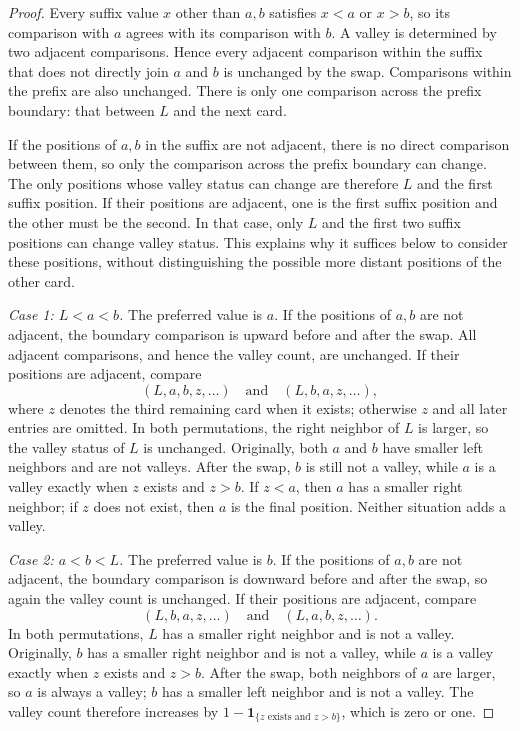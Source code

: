 \documentclass[10pt,a4paper]{amsart}
\numberwithin{equation}{section}
\begin{document}
\begin{proof}
Every suffix value $x$ other than $a,b$ satisfies $x<a$ or $x>b$, so its comparison with $a$ agrees with its comparison with $b$. A valley is determined by two adjacent comparisons. Hence every adjacent comparison within the suffix that does not directly join $a$ and $b$ is unchanged by the swap. Comparisons within the prefix are also unchanged. There is only one comparison across the prefix boundary: that between $L$ and the next card.

If the positions of $a,b$ in the suffix are not adjacent, there is no direct comparison between them, so only the comparison across the prefix boundary can change. The only positions whose valley status can change are therefore $L$ and the first suffix position. If their positions are adjacent, one is the first suffix position and the other must be the second. In that case, only $L$ and the first two suffix positions can change valley status. This explains why it suffices below to consider these positions, without distinguishing the possible more distant positions of the other card.

\emph{Case 1: $L<a<b$.}
The preferred value is $a$. If the positions of $a,b$ are not adjacent, the boundary comparison is upward before and after the swap. All adjacent comparisons, and hence the valley count, are unchanged. If their positions are adjacent, compare
\[
 (L,a,b,z,\ldots)\quad\text{and}\quad(L,b,a,z,\ldots),
\]
where $z$ denotes the third remaining card when it exists; otherwise $z$ and all later entries are omitted. In both permutations, the right neighbor of $L$ is larger, so the valley status of $L$ is unchanged. Originally, both $a$ and $b$ have smaller left neighbors and are not valleys. After the swap, $b$ is still not a valley, while $a$ is a valley exactly when $z$ exists and $z>b$. If $z<a$, then $a$ has a smaller right neighbor; if $z$ does not exist, then $a$ is the final position. Neither situation adds a valley.

\emph{Case 2: $a<b<L$.}
The preferred value is $b$. If the positions of $a,b$ are not adjacent, the boundary comparison is downward before and after the swap, so again the valley count is unchanged. If their positions are adjacent, compare
\[
 (L,b,a,z,\ldots)\quad\text{and}\quad(L,a,b,z,\ldots).
\]
In both permutations, $L$ has a smaller right neighbor and is not a valley. Originally, $b$ has a smaller right neighbor and is not a valley, while $a$ is a valley exactly when $z$ exists and $z>b$. After the swap, both neighbors of $a$ are larger, so $a$ is always a valley; $b$ has a smaller left neighbor and is not a valley. The valley count therefore increases by $1-\mathbf1_{\{z\text{ exists and }z>b\}}$, which is zero or one.


\end{proof}
\end{document}
